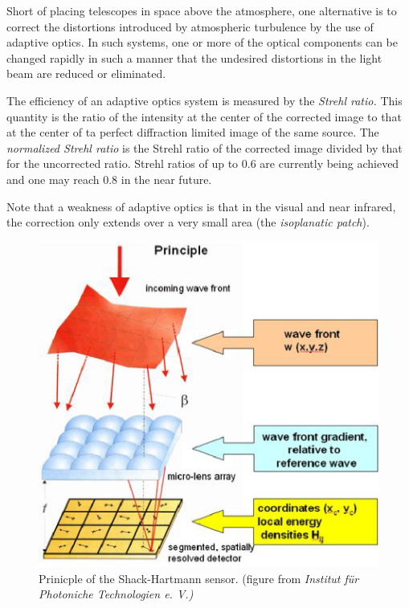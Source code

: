 \documentclass{article}
\begin{document}
Short of placing telescopes in space above the atmosphere, one alternative is
to correct the distortions introduced by atmospheric turbulence by the use
of adaptive optics. In such systems, one or more of the optical components
can be changed rapidly in such a manner that the undesired distortions
in the light beam are reduced or eliminated. 

The efficiency of an adaptive optics system is measured by the 
{\it Strehl ratio.} This quantity is the ratio of the intensity at the center
of the corrected image to that at the center of ta perfect diffraction 
limited image of the same source. The {\it normalized Strehl ratio} is the 
Strehl ratio of the corrected image divided by that for the uncorrected 
ratio. Strehl ratios of up to $0.6$ are currently being achieved and one may 
reach $0.8$ in the near future.

Note that a weakness of adaptive optics is that in the visual and near 
infrared, the correction only extends over a very small area (the 
{\it isoplanatic patch}). 

\begin{figure}[h]
  \centering  \includegraphics{shack-hartmann.eps}
  \caption{Prinicple of the Shack-Hartmann sensor. (figure from {\it
Institut f\"ur Photoniche Technologien e. V.)}}
  \label{fig:shack-hartmann}
\end{figure}
\end{document}
